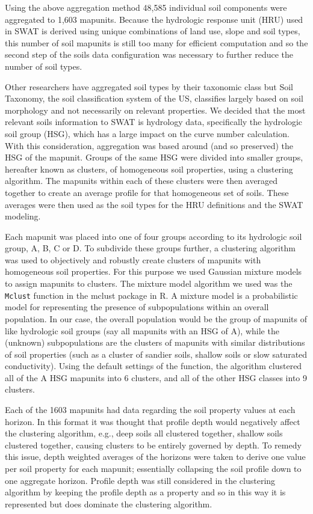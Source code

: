 {Using the above aggregation method 48,585 individual soil components were
aggregated to 1,603 mapunits. Because the hydrologic response unit (HRU) used in
SWAT is derived using unique combinations of land use, slope and soil types,
this number of soil mapunits is still too many for efficient computation  and so
the second step of the soils data configuration was necessary to further reduce
the number of soil types. %

Other researchers have aggregated soil types by their taxonomic class
\citep{gatzke_aggregation_2011} but Soil Taxonomy, the soil classification
system of the US, classifies largely based on soil morphology and not
necessarily on relevant properties. We decided that the most relevant soils
information to SWAT is hydrology data, specifically the hydrologic soil group
(HSG), which has a large impact on the curve number calculation. With this
consideration, aggregation was based around (and so preserved) the HSG of the
mapunit. Groups of the same HSG were divided into smaller groups, hereafter
known as clusters, of homogeneous soil properties, using a clustering algorithm.
The mapunits within each of these clusters were then averaged together to create
an average profile for that homogeneous set of soils. These averages were then
used as the soil types for the HRU definitions and the SWAT modeling.

Each mapunit was placed into one of four groups according to its hydrologic soil
group, A, B, C or D. To subdivide these groups further, a clustering algorithm
was used to objectively and robustly create clusters of mapunits with
homogeneous soil properties. For this purpose we used Gaussian mixture models to
assign mapunits to clusters. The mixture model algorithm we used was the
\texttt{Mclust} function in the mclust package \citep{fraley_mclust_2012} in R.
A mixture model is a probabilistic model for representing the presence of
subpopulations within an overall population. In our case, the overall population
would be the group of mapunits of like hydrologic soil groups (say all mapunits
with an HSG of A), while the (unknown) subpopulations are the clusters of
mapunits with similar distributions of soil properties (such as a cluster of
sandier soils, shallow soils or slow saturated conductivity). Using the default
settings of the function, the algorithm clustered all of the A HSG mapunits into
6 clusters, and all of the other HSG classes into 9 clusters.

Each of the 1603 mapunits had data regarding the soil property values at each
horizon. In this format it was thought that profile depth would negatively
affect the clustering algorithm, e.g., deep soils all clustered together,
shallow soils clustered together, causing clusters to be entirely governed by
depth. To remedy this issue, depth weighted averages of the horizons were taken
to derive one value per soil property for each mapunit; essentially collapsing
the soil profile down to one aggregate horizon. Profile depth was still
considered in the clustering algorithm by keeping the profile depth as a
property and so in this way it is represented but does dominate the clustering
algorithm.


}
